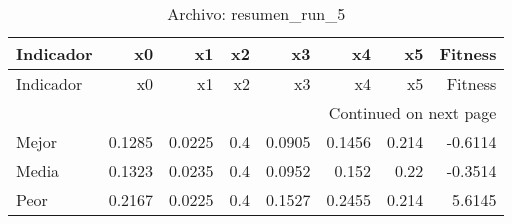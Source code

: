 \begin{longtable}{lrrrrrrr}
\caption{Archivo: resumen\_run\_5}\label{tab:resumen_run_5} \\
\toprule
Indicador & x0 & x1 & x2 & x3 & x4 & x5 & Fitness \\
\midrule
\endfirsthead
\toprule
Indicador & x0 & x1 & x2 & x3 & x4 & x5 & Fitness \\
\midrule
\endhead
\midrule
\multicolumn{8}{r}{Continued on next page} \\
\midrule
\endfoot
\bottomrule
\endlastfoot
Mejor & 0.1285 & 0.0225 & 0.4 & 0.0905 & 0.1456 & 0.214 & -0.6114 \\
Media & 0.1323 & 0.0235 & 0.4 & 0.0952 & 0.152 & 0.22 & -0.3514 \\
Peor & 0.2167 & 0.0225 & 0.4 & 0.1527 & 0.2455 & 0.214 & 5.6145 \\
\end{longtable}